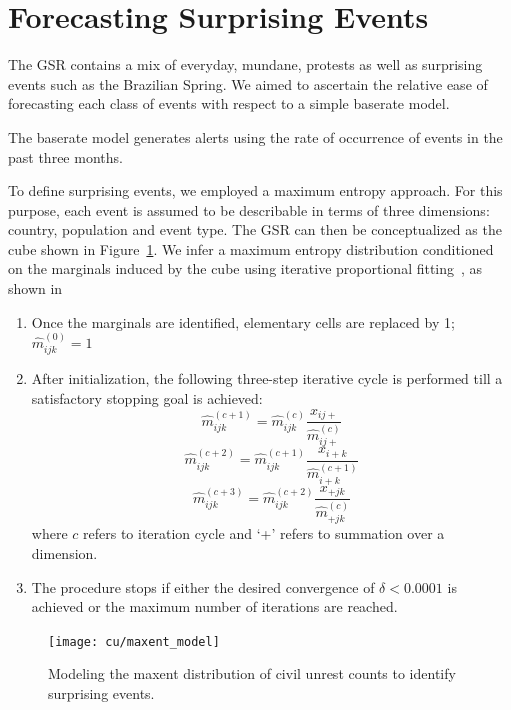 


\section{Forecasting Surprising Events}

The GSR contains a mix of everyday, mundane, protests as well as surprising events such as the Brazilian Spring.
We aimed to ascertain the relative ease of forecasting each class of events
with respect to a simple baserate model.

The baserate model generates alerts using the rate of occurrence of events in the past three months.

To define surprising events,
we employed a maximum entropy approach. For this purpose, each event is assumed
to be describable
in terms of three dimensions: country, population and event type. The GSR can then be conceptualized
as the cube shown in Figure~\ref{fig:maxent_model}. We infer a maximum entropy distribution conditioned on the marginals
induced by the cube using iterative proportional fitting~\cite{bishop2007discrete}, as shown in 


\begin{enumerate}
\item Once the marginals are identified, elementary cells are replaced by 1; $\widehat{m}^{(0)}_{ijk}=1$
\item After initialization, the following three-step iterative cycle is performed till a satisfactory stopping goal is achieved:
$$\widehat{m}^{(c+1)}_{ijk} = \widehat{m}^{(c)}_{ijk}\frac{x_{ij+}}{\widehat{m}^{(c)}_{ij+}}$$
$$\widehat{m}^{(c+2)}_{ijk} = \widehat{m}^{(c+1)}_{ijk}\frac{x_{i+k}}{\widehat{m}^{(c+1)}_{i+k}}$$
$$\widehat{m}^{(c+3)}_{ijk} = \widehat{m}^{(c+2)}_{ijk}\frac{x_{+jk}}{\widehat{m}^{(c)}_{+jk}}$$
where $c$ refers to iteration cycle and `+' refers to summation over a dimension.
\item The procedure stops if either the desired convergence of $\delta < 0.0001$ is achieved or the maximum number of iterations are reached.
\end{enumerate}


\begin{figure}[H]
\centering
\texttt{[image: cu/maxent\_model]}
\caption{Modeling the maxent distribution of civil unrest counts to identify surprising events.}
\label{fig:maxent_model}
\end{figure}

